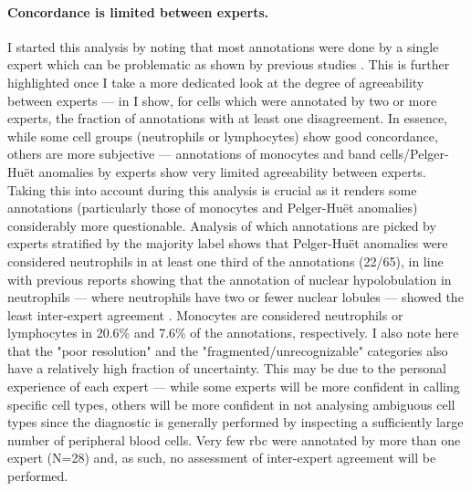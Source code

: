 \begin{figure}[!ht]
    \label{fig:tbca}
\end{figure}

\paragraph{Concordance is limited between experts.} I started this analysis by noting that most annotations were done by a single expert which can be problematic as shown by previous studies \cite{De_Swart2017-wc,Howe2004-mn,Goasguen2009-dn,Foucar2020-uz}. This is further highlighted once I take a more dedicated look at the degree of agreeability between experts --- in  I show, for cells which were annotated by two or more experts, the fraction of annotations with at least one disagreement. In essence, while some cell groups (neutrophils or lymphocytes) show good concordance, others are more subjective --- annotations of monocytes and band cells/Pelger-Huët anomalies by experts show very limited agreeability between experts. Taking this into account during this analysis is crucial as it renders some annotations (particularly those of monocytes and Pelger-Huët anomalies) considerably more questionable. Analysis of which annotations are picked by experts stratified by the majority label shows that Pelger-Huët anomalies were considered neutrophils in at least one third of the annotations (22/65), in line with previous reports showing that the annotation of nuclear hypolobulation in neutrophils --- where neutrophils have two or fewer nuclear lobules --- showed the least inter-expert agreement \cite{Weinberg2015-ra}. Monocytes are considered neutrophils or lymphocytes in 20.6\% and 7.6\% of the annotations, respectively. I also note here that the "poor resolution" and the "fragmented/unrecognizable" categories also have a relatively high fraction of uncertainty. This may be due to the personal experience of each expert --- while some experts will be more confident in calling specific cell types, others will be more confident in not analysing ambiguous cell types since the diagnostic is generally performed by inspecting a sufficiently large number of peripheral blood cells. Very few \ac{rbc} were annotated by more than one expert (N=28) and, as such, no assessment of inter-expert agreement will be performed.

